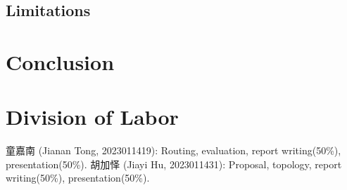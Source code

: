 \documentclass[11pt]{article}
\begin{document}
\subsection{Limitations}

\section{Conclusion}

\appendix
\section{Division of Labor}
\begin{CJK}{UTF8}{gbsn}
童嘉南 (Jianan Tong, 2023011419): Routing, evaluation, report writing(50\%), presentation(50\%).
胡加怿 (Jiayi Hu, 2023011431): Proposal, topology, report writing(50\%), presentation(50\%).
\end{CJK}


\end{document}
